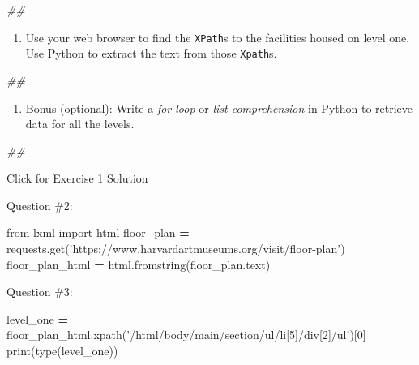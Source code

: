 \documentclass[]{book}
\newenvironment{Shaded}{\begin{snugshade}}{\end{snugshade}}
\newcommand{\BuiltInTok}[1]{#1}
\newcommand{\CommentTok}[1]{\textcolor[rgb]{0.56,0.35,0.01}{\textit{#1}}}
\newcommand{\DecValTok}[1]{\textcolor[rgb]{0.00,0.00,0.81}{#1}}
\newcommand{\ImportTok}[1]{#1}
\newcommand{\NormalTok}[1]{#1}
\newcommand{\OperatorTok}[1]{\textcolor[rgb]{0.81,0.36,0.00}{\textbf{#1}}}
\newcommand{\StringTok}[1]{\textcolor[rgb]{0.31,0.60,0.02}{#1}}
\providecommand{\tightlist}{%
  \setlength{\itemsep}{0pt}\setlength{\parskip}{0pt}}
\begin{document}
\begin{Shaded}
\begin{Highlighting}[]
\CommentTok{##}
\end{Highlighting}
\end{Shaded}

\begin{enumerate}
\def\labelenumi{\arabic{enumi}.}
\setcounter{enumi}{2}
\tightlist
\item
  Use your web browser to find the \texttt{XPath}s to the facilities housed on
  level one. Use Python to extract the text from those \texttt{Xpath}s.
\end{enumerate}

\begin{Shaded}
\begin{Highlighting}[]
\CommentTok{##}
\end{Highlighting}
\end{Shaded}

\begin{enumerate}
\def\labelenumi{\arabic{enumi}.}
\setcounter{enumi}{3}
\tightlist
\item
  Bonus (optional): Write a \emph{for loop} or \emph{list comprehension} in Python
  to retrieve data for all the levels.
\end{enumerate}

\begin{Shaded}
\begin{Highlighting}[]
\CommentTok{##}
\end{Highlighting}
\end{Shaded}

{Click for Exercise 1 Solution}

Question \#2:

\begin{Shaded}
\begin{Highlighting}[]
\ImportTok{from}\NormalTok{ lxml }\ImportTok{import}\NormalTok{ html}
\NormalTok{floor_plan }\OperatorTok{=}\NormalTok{ requests.get(}\StringTok{'https://www.harvardartmuseums.org/visit/floor-plan'}\NormalTok{)}
\NormalTok{floor_plan_html }\OperatorTok{=}\NormalTok{ html.fromstring(floor_plan.text)}
\end{Highlighting}
\end{Shaded}

Question \#3:

\begin{Shaded}
\begin{Highlighting}[]
\NormalTok{level_one }\OperatorTok{=}\NormalTok{ floor_plan_html.xpath(}\StringTok{'/html/body/main/section/ul/li[5]/div[2]/ul'}\NormalTok{)[}\DecValTok{0}\NormalTok{]}
\BuiltInTok{print}\NormalTok{(}\BuiltInTok{type}\NormalTok{(level_one))}
\end{Highlighting}
\end{Shaded}
\end{document}
